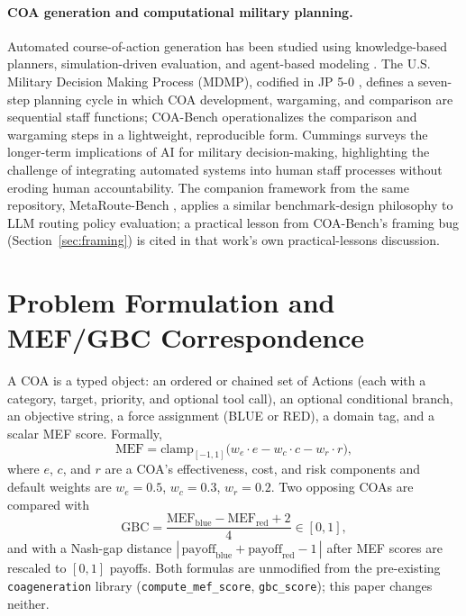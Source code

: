 \documentclass[letterpaper]{article} %
\begin{document}
\paragraph{COA generation and computational military planning.} Automated course-of-action generation has been studied using knowledge-based planners, simulation-driven evaluation, and agent-based modeling \citep{sokolowski2010military}. The U.S. Military Decision Making Process (MDMP), codified in JP 5-0 \citep{jp50}, defines a seven-step planning cycle in which COA development, wargaming, and comparison are sequential staff functions; COA-Bench operationalizes the comparison and wargaming steps in a lightweight, reproducible form. Cummings \citep{cummings2017artificial} surveys the longer-term implications of AI for military decision-making, highlighting the challenge of integrating automated systems into human staff processes without eroding human accountability. The companion framework from the same repository, MetaRoute-Bench \citep{vidra2026metaroute}, applies a similar benchmark-design philosophy to LLM routing policy evaluation; a practical lesson from COA-Bench's framing bug (Section~\ref{sec:framing}) is cited in that work's own practical-lessons discussion.

\section{Problem Formulation and MEF/GBC Correspondence}
\label{sec:tmda}

A COA is a typed object: an ordered or chained set of Actions (each with a category, target, priority, and optional tool call), an optional conditional branch, an objective string, a force assignment (BLUE or RED), a domain tag, and a scalar MEF score. Formally,
\begin{equation}
\mathrm{MEF} = \mathrm{clamp}_{[-1,1]}\big(w_e \cdot e - w_c \cdot c - w_r \cdot r\big),
\end{equation}
where $e$, $c$, and $r$ are a COA's effectiveness, cost, and risk components and default weights are $w_e=0.5$, $w_c=0.3$, $w_r=0.2$. Two opposing COAs are compared with
\begin{equation}
\mathrm{GBC} = \frac{\mathrm{MEF}_{\mathrm{blue}} - \mathrm{MEF}_{\mathrm{red}} + 2}{4} \in [0,1],
\end{equation}
and with a Nash-gap distance $|\,\mathrm{payoff}_{\mathrm{blue}} + \mathrm{payoff}_{\mathrm{red}} - 1\,|$ after MEF scores are rescaled to $[0,1]$ payoffs. Both formulas are unmodified from the pre-existing \texttt{coageneration} library (\texttt{compute\_mef\_score}, \texttt{gbc\_score}); this paper changes neither.
\end{document}
